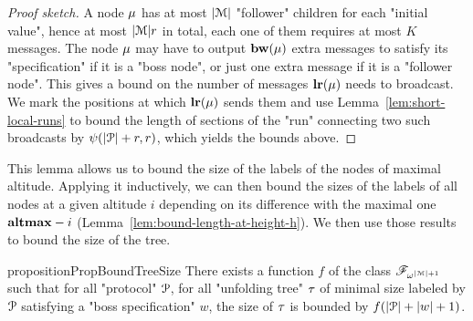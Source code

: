 \begin{proof}[Proof sketch]
	A node $\mu$ has at most $|\mathcal{M}|$ "follower" children for each "initial value", hence at most $|\mathcal{M}|r$ in total, each one of them requires at most $K$ messages. The node $\mu$ may have to output $\mathbf{bw}(\mu)$ extra messages to satisfy its "specification" if it is a "boss node", or just one extra message if it is a "follower node".
	This gives a bound on the number of messages $\mathbf{lr}(\mu)$ needs to broadcast. We mark the positions at which $\mathbf{lr}(\mu)$ sends them and use Lemma~\ref{lem:short-local-runs} to bound the length of sections of the "run" connecting two such broadcasts by $\psi(|\mathcal{P}|+r,r)$, which yields the bounds above.
\end{proof}

This lemma allows us to bound the size of the labels of the nodes of maximal altitude. Applying it inductively, we can then bound the sizes of the labels of all nodes at a given altitude $i$ depending on its difference with the maximal one $\mathbf{altmax}-i$ (Lemma~\ref{lem:bound-length-at-height-h}). We then use those results to bound the size of the tree.

 
\begin{restatable}{proposition}{PropBoundTreeSize}
	\label{prop:bound-tree-size}
	There exists a function $f$ of the class $\mathscr{F}_{\omega^{|\mathcal{M}|+1}}$ such that for all "protocol" $\mathcal{P}$, for all "unfolding tree" $\tau$ of minimal size labeled by $\mathcal{P}$ satisfying a "boss specification" $w$, the size of $\tau$ is bounded by $f(|\mathcal{P}| + |w|+1)$.
\end{restatable}

